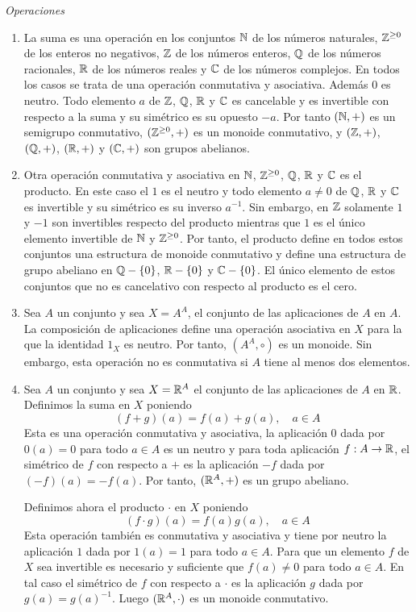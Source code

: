\begin{ejs}{\it Operaciones}
    \begin{enumerate}[label=(\arabic*)]
        \item La suma es una operación en los conjuntos $\mathbb{N}$ de los números naturales, $\mathbb{Z}^{\geq 0}$ de los enteros no negativos, $\mathbb{Z}$ de los números enteros, $\mathbb{Q}$ de los números racionales, $\mathbb{R}$ de los números reales y $\mathbb{C}$ de los números complejos. En todos los casos se trata de una operación conmutativa y asociativa. Además $0$ es neutro. Todo elemento $a$ de $\mathbb{Z}$, $\mathbb{Q}$, $\mathbb{R}$ y $\mathbb{C}$ es cancelable y es invertible con respecto a la suma y su simétrico es su opuesto $-a$. Por tanto $(\mathbb{N}, +)$ es un semigrupo conmutativo, $(\mathbb{Z}^{\geq 0}, +)$ es un monoide conmutativo, y $(\mathbb{Z}, +)$, $(\mathbb{Q}, +)$, $(\mathbb{R}, +)$ y $(\mathbb{C}, +)$ son grupos abelianos.
        \item Otra operación conmutativa y asociativa en $\mathbb{N}$, $\mathbb{Z}^{\geq 0}$, $\mathbb{Q}$, $\mathbb{R}$ y $\mathbb{C}$ es el producto. En este caso el $1$ es el neutro y todo elemento $a\neq 0$ de $\mathbb{Q}$, $\mathbb{R}$ y $\mathbb{C}$ es invertible y su simétrico es su inverso $a^{-1}$. Sin embargo, en $\mathbb{Z}$ solamente $1$ y $-1$ son invertibles respecto del producto mientras que $1$ es el único elemento invertible de $\mathbb{N}$ y $\mathbb{Z}^{\geq 0}$. Por tanto, el producto define en todos estos conjuntos una estructura de monoide conmutativo y define una estructura de grupo abeliano en $\mathbb{Q}-\left\lbrace0\right\rbrace$, $\mathbb{R}-\left\lbrace0\right\rbrace$ y $\mathbb{C}-\left\lbrace0\right\rbrace$. El único elemento de estos conjuntos que no es cancelativo con respecto al producto es el cero.
        \item Sea $A$ un conjunto y sea $X=A^A$, el conjunto de las aplicaciones de $A$ en $A$. La composición de aplicaciones define una operación asociativa en $X$ para la que la identidad $1_X$ es neutro. Por tanto, $(A^A, \circ)$ es un monoide. Sin embargo, esta operación no es conmutativa si $A$ tiene al menos dos elementos.
        \item Sea $A$ un conjunto y sea $X=\mathbb{R}^A$ el conjunto de las aplicaciones de $A$ en $\mathbb{R}$. Definimos la suma en $X$ poniendo
        $$(f+g)(a)=f(a)+g(a), \quad a\in A$$
        Esta es una operación conmutativa y asociativa, la aplicación $0$ dada por $0(a)=0$ para todo $a\in A$ es un neutro y para toda aplicación $f:A\rightarrow\mathbb{R}$, el simétrico de $f$ con respecto a $+$ es la aplicación $-f$ dada por $(-f)(a)=-f(a)$. Por tanto, $(\mathbb{R}^A,+)$ es un grupo abeliano.

        Definimos ahora el producto $\cdot$ en $X$ poniendo
        $$(f\cdot g)(a)=f(a)g(a), \quad a\in A$$
        Esta operación también es conmutativa y asociativa y tiene por neutro la aplicación $1$ dada por $1(a)=1$ para todo $a\in A$. Para que un elemento $f$ de $X$ sea invertible es necesario y suficiente que $f(a)\neq 0$ para todo $a\in A$. En tal caso el simétrico de $f$ con respecto a $\cdot$ es la aplicación $g$ dada por $g(a)=g(a)^{-1}$. Luego $(\mathbb{R}^A, \cdot)$ es un monoide conmutativo.
    \end{enumerate}
\end{ejs}

